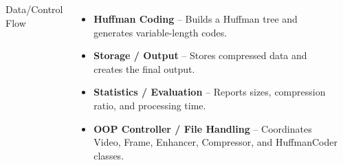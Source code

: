 \documentclass[aspectratio=169,11pt]{beamer}
\begin{document}
\begin{frame}
\begin{columns}[T,totalwidth=\textwidth]
\begin{itemize}
\end{itemize}

{\small
\textbf{\color{GEUBlue}}Data/Control Flow
}

\begin{itemize}

\setlength{\itemsep}{0pt}

\tiny

\item
\textbf{Huffman Coding}
-- Builds a Huffman tree and generates variable-length codes.

\item
\textbf{Storage / Output}
-- Stores compressed data and creates the final output.

\item
\textbf{Statistics / Evaluation}
-- Reports sizes, compression ratio, and processing time.

\item
\textbf{OOP Controller / File Handling}
-- Coordinates Video, Frame, Enhancer, Compressor, and HuffmanCoder classes.
\end{itemize}
\end{columns}
\end{frame}
\end{document}
